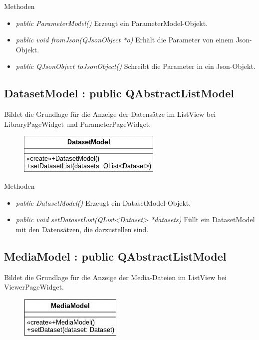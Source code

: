 Methoden
\begin{itemize}
	\item\textit{public ParameterModel()}
	Erzeugt ein ParameterModel-Objekt.
	\item\textit{public void fromJson(QJsonObject *o)}
	Erhält die Parameter von einem Json-Objekt.
	\item\textit{public QJsonObject toJsonObject()}
	Schreibt die Parameter in ein Json-Objekt.
\end{itemize}

\subsection*{DatasetModel : public QAbstractListModel}
Bildet die Grundlage für die Anzeige der Datensätze im ListView bei LibraryPageWidget und ParameterPageWidget.

\begin{figure}[H]
	\centering
	\includegraphics[scale=0.5]{img/Klassendiagramm/Klassen/View/DatasetModel}
	\label{fig:datasetModel}
\end{figure}

Methoden
\begin{itemize}
	\item\textit{public DatasetModel()}
	Erzeugt ein DatasetModel-Objekt.
	\item\textit{public void setDatasetList(QList<Dataset> *datasets)}
	Füllt ein DatasetModel mit den Datensätzen, die darzustellen sind.
\end{itemize}

\subsection*{MediaModel : public QAbstractListModel}
Bildet die Grundlage für die Anzeige der Media-Dateien im ListView bei ViewerPageWidget.

\begin{figure}[H]
	\centering
	\includegraphics[scale=0.5]{img/Klassendiagramm/Klassen/View/MediaModel}
	\label{fig:mediaModel}
\end{figure}


